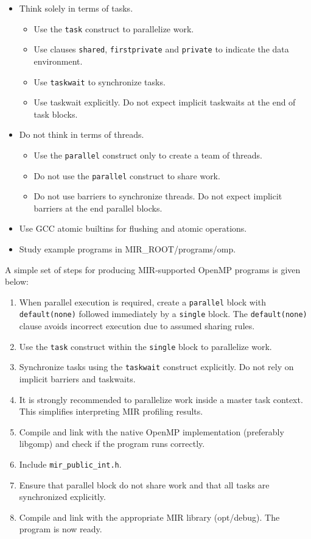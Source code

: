 \documentclass[11pt,a4paper]{article}
\begin{document}
\begin{itemize}
    \item Think solely in terms of tasks.
    \begin{itemize}
        \item Use the \texttt{task} construct to parallelize work.
        \item Use clauses \texttt{shared}, \texttt{firstprivate} and \texttt{private} to indicate the data environment.
        \item Use \texttt{taskwait} to synchronize tasks.
        \item Use taskwait explicitly. Do not expect implicit taskwaits at the end of task blocks. 
    \end{itemize}
    \item Do not think in terms of threads.
    \begin{itemize}
        \item Use the \texttt{parallel} construct only to create a team of threads.
        \item Do not use the \texttt{parallel} construct to share work.
        \item Do not use barriers to synchronize threads. Do not expect implicit barriers at the end parallel blocks.
    \end{itemize}
    \item Use GCC atomic builtins for flushing and atomic operations.
    \item Study example programs in MIR\_ROOT/programs/omp.
\end{itemize}

A simple set of steps for producing MIR-supported OpenMP programs is given below:

\begin{enumerate}
\item When parallel execution is required, create a \texttt{parallel}  block with \texttt{default(none)} followed immediately by a \texttt{single} block. The \texttt{default(none)} clause avoids incorrect execution due to assumed sharing rules.
\item Use the \texttt{task} construct within the \texttt{single} block to parallelize work.
\item Synchronize tasks using the \texttt{taskwait} construct explicitly. Do not rely on implicit barriers and taskwaits.
\item It is strongly recommended to parallelize work inside a master task context. This simplifies interpreting MIR profiling results.
\item Compile and link with the native OpenMP implementation (preferably libgomp) and check if the program runs correctly.
\item Include \texttt{mir\_public\_int.h}.
\item Ensure that parallel block do not share work and that all tasks are synchronized explicitly.
\item Compile and link with the appropriate MIR library (opt/debug). The program is now ready.
\end{enumerate}
\end{document}
